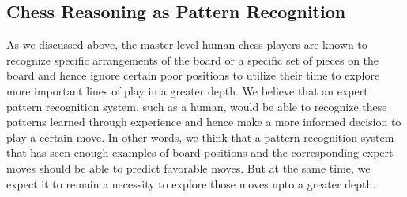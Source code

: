 \subsection{Chess Reasoning as Pattern Recognition}
\label{section:chess-as-pr}
As we discussed above, the master level human chess players are known to 
recognize specific arrangements of the board or a specific set of pieces on the 
board and hence ignore certain poor positions to utilize their time to explore 
more important lines of play in a greater depth. We believe that an expert 
pattern recognition system, such as a human, would be able to recognize these 
patterns learned through experience and hence make a more informed decision to 
play a certain move. In other words, we think that a pattern recognition system 
that has seen enough examples of board positions and the corresponding expert 
moves should be able to predict favorable moves. But at the same time, we expect 
it to remain a necessity to explore those moves upto a greater depth.



